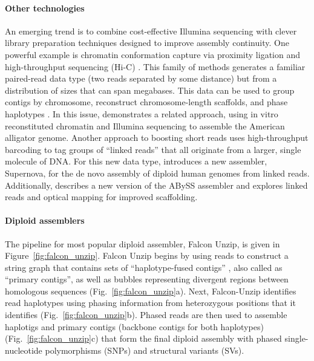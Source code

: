 \paragraph{Other technologies}
An emerging trend is to combine cost-effective Illumina sequencing with clever library preparation techniques designed to improve assembly continuity. 
One powerful example is chromatin conformation capture via proximity ligation and high-throughput sequencing (Hi-C) \citep{lieberman2009comprehensive}. 
This family of methods generates a familiar paired-read data type (two reads separated by some distance) but from a distribution of sizes that can span megabases. 
This data can be used to group contigs by chromosome, reconstruct chromosome-length scaffolds, and phase haplotypes \citep{burton2013chromosome, selvaraj2013whole}. 
In this issue, \cite{rice2017improved} demonstrates a related approach, using in vitro reconstituted chromatin and Illumina sequencing to assemble the American alligator genome. 
Another approach to boosting short reads uses high-throughput barcoding to tag groups of ``linked reads'' that all originate from a larger, single molecule of DNA. 
For this new data type, \cite{weisenfeld2017direct} introduces a new assembler, Supernova, for the de novo assembly of diploid human genomes from linked reads. 
Additionally, \cite{jackman2017abyss} describes a new version of the ABySS assembler and explores linked reads and optical mapping for improved scaffolding.
\paragraph{Diploid assemblers}
The pipeline for most popular diploid assembler, Falcon Unzip, is given in Figure~\ref{fig:falcon_unzip}.
Falcon Unzip begins by using reads to construct a string graph that contains sets of ``haplotype-fused contigs'' , also called as ``primary contigs'', as well as bubbles representing divergent regions between homologous sequences (Fig.~\ref{fig:falcon_unzip}a). 
Next, Falcon-Unzip identifies read haplotypes using phasing information from heterozygous positions that it identifies (Fig.~\ref{fig:falcon_unzip}b). 
Phased reads are then used to assemble haplotigs and primary contigs (backbone contigs for both haplotypes) (Fig.~\ref{fig:falcon_unzip}c) 
that form the final diploid assembly with phased single-nucleotide polymorphisms (SNPs) and structural variants (SVs).

